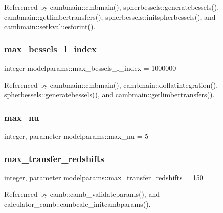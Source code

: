 Referenced by cambmain\+::cmbmain(), spherbessels\+::generatebessels(), cambmain\+::getlimbertransfers(), spherbessels\+::initspherbessels(), and cambmain\+::setkvaluesforint().

\mbox{\label{namespacemodelparams_a0398b22cb85696d3eeaf76b7db97215c}} 
\subsubsection{\texorpdfstring{max\+\_\+bessels\+\_\+l\+\_\+index}{max\_bessels\_l\_index}}
{\footnotesize\ttfamily integer modelparams\+::max\+\_\+bessels\+\_\+l\+\_\+index = 1000000}



Referenced by cambmain\+::cmbmain(), cambmain\+::doflatintegration(), spherbessels\+::generatebessels(), and cambmain\+::getlimbertransfers().

\mbox{\label{namespacemodelparams_a5e3667fcd2aae0fb15654c207fc6830e}} 
\subsubsection{\texorpdfstring{max\+\_\+nu}{max\_nu}}
{\footnotesize\ttfamily integer, parameter modelparams\+::max\+\_\+nu = 5}

\mbox{\label{namespacemodelparams_abe7b8d46cfb994afa85d77bbb5b6b5d5}} 
\subsubsection{\texorpdfstring{max\+\_\+transfer\+\_\+redshifts}{max\_transfer\_redshifts}}
{\footnotesize\ttfamily integer, parameter modelparams\+::max\+\_\+transfer\+\_\+redshifts = 150}



Referenced by camb\+::camb\+\_\+validateparams(), and calculator\+\_\+camb\+::cambcalc\+\_\+initcambparams().

